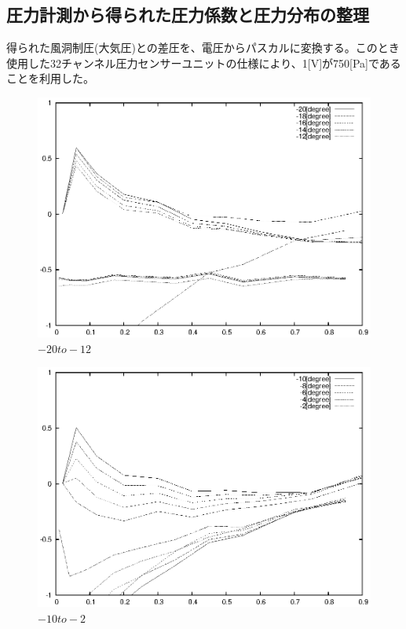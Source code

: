 \documentclass[a4j,twoside,openright,11pt]{jarticle}
\begin{document}
\subsection{圧力計測から得られた圧力係数と圧力分布の整理}
得られた風洞制圧(大気圧)との差圧を、電圧からパスカルに変換する。このとき使用した32チャンネル圧力センサーユニットの仕様により、1[V]が750[Pa]であることを利用した。
\begin{figure}[htbp]
\begin{center}
\includegraphics[width=12cm]{./2-CP/-20to-12.eps}
\end{center}
\caption{$-20to-12$}
\end{figure}

\begin{figure}[htbp]
\begin{center}
\includegraphics[width=12cm]{./2-CP/-10to-2.eps}
\end{center}
\caption{$-10to-2$}
\end{figure}
\end{document}
